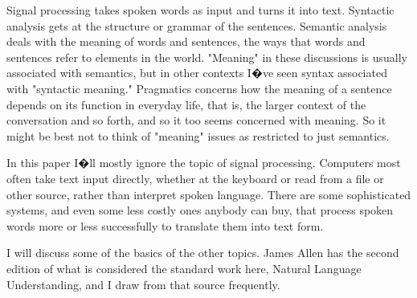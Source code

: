 Signal processing takes spoken words as input and turns it into text. Syntactic analysis gets at the structure or grammar of the sentences. Semantic analysis deals with the meaning of words and sentences, the ways that words and sentences refer to elements in the world. "Meaning" in these discussions is usually associated with semantics, but in other contexts I�ve seen syntax associated with "syntactic meaning." Pragmatics concerns how the meaning of a sentence depends on its function in everyday life, that is, the larger context of the conversation and so forth, and so it too seems concerned with meaning. So it might be best not to think of "meaning" issues as restricted to just semantics.

In this paper I�ll mostly ignore the topic of signal processing. Computers most often take text input directly, whether at the keyboard or read from a file or other source, rather than interpret spoken language. There are some sophisticated systems, and even some less costly ones anybody can buy, that process spoken words more or less successfully to translate them into text form.

I will discuss some of the basics of the other topics. James Allen has the second edition of what is considered the standard work here, Natural Language Understanding, and I draw from that source frequently.


